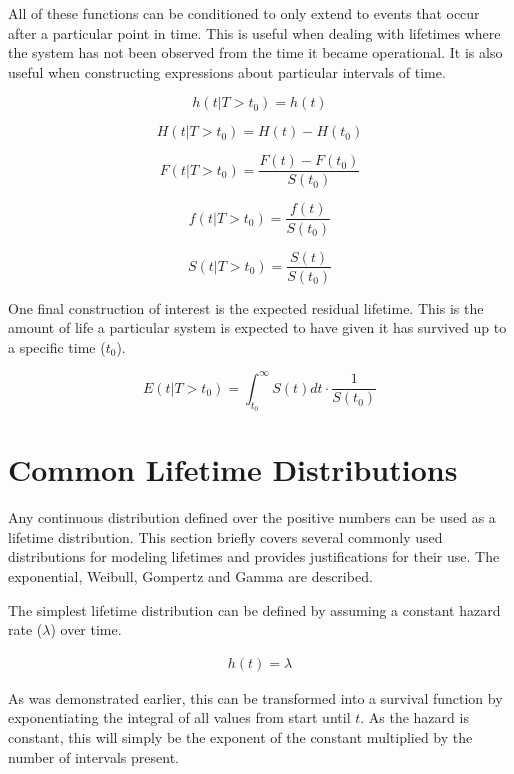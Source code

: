 All of these functions can be conditioned to only extend to events that occur after a particular point in time. This is useful when dealing with lifetimes where the system has not been observed from the time it became operational. It is also useful when constructing expressions about particular intervals of time\cite{Cleves2008}.

$$ h(t|T > t_0) = h(t) $$

$$ H(t|T > t_0) = H(t) - H(t_0) $$

$$ F(t|T > t_0) = \frac{F(t) - F(t_0)}{S(t_0)} $$

$$ f(t|T > t_0) = \frac{f(t)}{S(t_0)} $$

$$ S(t|T > t_0) = \frac{S(t)}{S(t_0)} $$

One final construction of interest is the expected residual lifetime. This is the amount of life a particular system is expected to have given it has survived up to a specific time ($t_0$).

$$ E(t|T > t_0) = \int^\infty_{t_0} S(t) dt \cdot \frac{1}{S(t_0)} $$







\section*{Common Lifetime Distributions}


Any continuous distribution defined over the positive numbers can be used as a lifetime distribution. This section briefly covers several commonly used distributions for modeling lifetimes and provides justifications for their use. The exponential, Weibull, Gompertz and Gamma are described.

The simplest lifetime distribution can be defined by assuming a constant hazard rate ($\lambda$) over time.

\begin{align*}
h(t) = \lambda \tag{ $\lambda > 0$}
\end{align*}

As was demonstrated earlier, this can be transformed into a survival function by exponentiating the integral of all values from start until $t$. As the hazard is constant, this will simply be the exponent of the constant multiplied by the number of intervals present.

